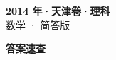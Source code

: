 \documentclass[zihao=-4, a4paper]{ctexart}
\begin{document}
\begin{center}
  {\Large\bfseries 2014 年·天津卷·理科}\\[4pt]
  {\large 数学 · 简答版}
\end{center}
\medskip
{}

\clearpage
{}
\begin{center}{\Large\bfseries 答案速查}\end{center}
\medskip

\end{document}
